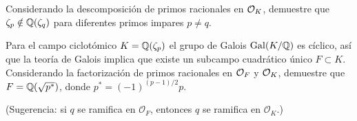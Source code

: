 \begin{ejercicio}
  Considerando la descomposición de primos racionales en $\mathcal{O}_K$, demuestre que
  $\zeta_p \notin \mathbb{Q} (\zeta_q)$ para diferentes primos impares $p \ne q$.
\end{ejercicio}

\begin{ejercicio}
  Para el campo ciclotómico $K = \mathbb{Q} (\zeta_p)$ el grupo de Galois
  $\operatorname{Gal} (K/\mathbb{Q})$ es cíclico, así que la teoría de Galois implica que
  existe un subcampo cuadrático único $F \subset K$.
  Considerando la factorización de primos racionales en $\mathcal{O}_F$ y $\mathcal{O}_K$,
  demuestre que $F = \mathbb{Q} (\sqrt{p^*})$, donde $p^* = (-1)^{(p-1)/2} p$.

  \noindent (Sugerencia: si $q$ se ramifica en $\mathcal{O}_F$, entonces $q$ se
  ramifica en $\mathcal{O}_K$.)
\end{ejercicio}

